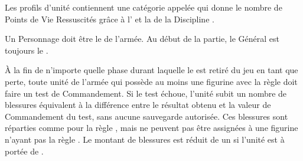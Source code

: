 \newcommand{\greatmonstrousrevenantrule}{%
Le \monstrousrevenant{} gagne la règle \thunderouscharge{} et sa taille de socle change en \unit{60x100}{\milli\meter}.
}

\newcommand{\colossalzombiedragonrule}{%
La figurine gagne +1 en Capacité de Combat, la valeur de sa \innatedefence{} passe à ($ 3+ $), et sa taille de socle change en \unit{100x150}{\milli\meter}.
}

\newcommand{\discordantchorusrule}{%
Dans une armée contenant une \shriekinghorror{} montée, les \shriekinghorrors{} non montées suivent la règle \oneofakind{}.
}


\newcommand{\QRSnote}{%
\noindent$^{1}$ En Monture, le Personnage remplace le \cadavermaster{}.

\noindent$^{2}$ En Monture, le Personnage remplace une \paramour{}.
}









\startarmywiderules

\armywideruleentry{\invocation}

Les profils d'unité contiennent une catégorie appelée \invocation{} qui donne le nombre de Points de Vie Ressuscités grâce à l'\necromancysignaturespell{} et la \necromancyspellfour{} de la Discipline \necromancy{}.

\armywideruleentry{\masterofundeath}

Un Personnage doit être le \textbf{\master{}} de l'armée. Au début de la partie, le Général est toujours le \master{}.

\closearmywiderules

\vspace*{1.5cm}
\startarmyspecialrules

\armyspecialruleentry{\ashestoashes}

À la fin de n'importe quelle phase durant laquelle le \master{} est retiré du jeu en tant que perte, toute unité de l'armée qui possède au moins une figurine avec la règle \ashestoashes{} doit faire un test de Commandement. Si le test échoue, l'unité subit un nombre de blessures équivalent à la différence entre le résultat obtenu et la valeur de Commandement du test, sans aucune sauvegarde autorisée. Ces blessures sont réparties comme pour la règle \unstable{}, mais ne peuvent pas être assignées à une figurine n'ayant pas la règle \ashestoashes{}. Le montant de blessures est réduit de un si l'unité est à portée de \holdyourground{}.

